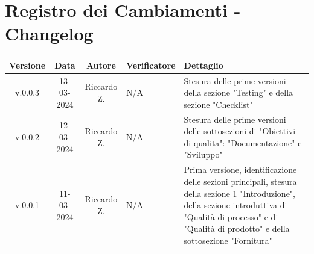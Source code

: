 \documentclass[12pt, oneside]{article}
\begin{document}
\section*{Registro dei Cambiamenti - Changelog}
\begin{tabular}{|c|c|c|p{3cm}|p{6cm}|}
\hline
\textbf{Versione} & \textbf{Data} & \textbf{Autore} & \textbf{Verificatore} & \textbf{Dettaglio} \\
\hline
v.0.0.3 & 13-03-2024 & Riccardo Z. & N/A & Stesura delle prime versioni della sezione "Testing" e della sezione "Checklist"\\
\hline
v.0.0.2 & 12-03-2024 & Riccardo Z. & N/A & Stesura delle prime versioni delle sottosezioni di "Obiettivi di qualita": "Documentazione" e "Sviluppo"\\
\hline
v.0.0.1 & 11-03-2024 & Riccardo Z. & N/A & Prima versione, identificazione delle sezioni principali, stesura della sezione 1 "Introduzione", della sezione introduttiva di "Qualità di processo" e di "Qualità di prodotto" e della sottosezione "Fornitura" \\
\hline
\end{tabular}
\newpage


\tableofcontents
\newpage

\newpage

\newpage

\newpage

\newpage

\newpage

\end{document}
